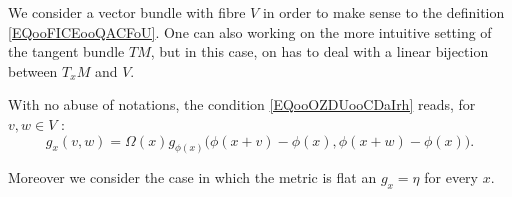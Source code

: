 \begin{remark}
    We consider a vector bundle with fibre \( V\) in order to make sense to the definition \eqref{EQooFICEooQACFoU}. One can also working on the more intuitive setting of the tangent bundle \( TM\), but in this case, on has to deal with a linear bijection between \( T_xM\) and \( V\).
\end{remark}

With no abuse of notations, the condition \eqref{EQooOZDUooCDaIrh} reads, for \( v,w\in V\) :
\begin{equation}\label{EQooFZUFooTGWpBn}
    g_x(v,w)=\Omega(x)g_{\phi(x)}\big(  \phi(x+v)-\phi(x),\phi(x+w)-\phi(x)  \big).
\end{equation}

Moreover we consider the case in which the metric is flat an \( g_x=\eta\) for every \( x\).
